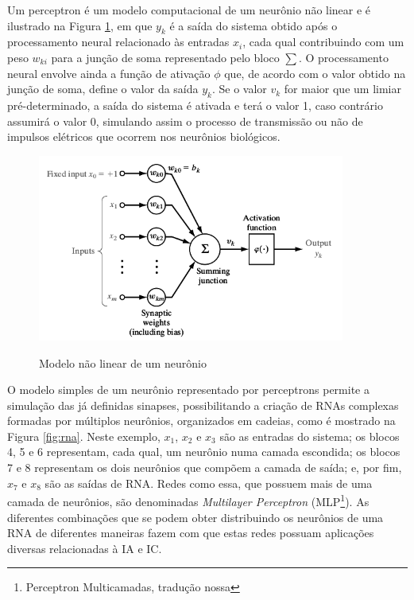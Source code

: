 Um perceptron é um modelo computacional de um neurônio não linear e é ilustrado na Figura \ref{fig:neuronmodel}, em que $y_k$ é a saída do sistema obtido após o processamento neural relacionado às entradas $x_i$, cada qual contribuindo com um peso $w_{ki}$ para a junção de soma representado pelo bloco $\sum$. O processamento neural envolve ainda a função de ativação $\phi$ que, de acordo com o valor obtido na junção de soma, define o valor da saída $y_k$. Se o valor $v_k$ for maior que um limiar pré-determinado, a saída do sistema é ativada e terá o valor 1, caso contrário assumirá o valor 0, simulando assim o processo de transmissão ou não de impulsos elétricos que ocorrem nos neurônios biológicos.

\begin{figure}[!htb]
    \centering
    \caption{Modelo não linear de um neurônio}
    \includegraphics[width=0.9\textwidth]{./04-figuras/neuron-diagram-gray}
    \label{fig:neuronmodel}
\end{figure}

O modelo simples de um neurônio representado por perceptrons permite a simulação das já definidas sinapses, possibilitando a criação de RNAs complexas formadas por múltiplos neurônios, organizados em cadeias, como é mostrado na Figura \ref{fig:rna}. Neste exemplo, $x_1$, $x_2$ e $x_3$ são as entradas do sistema; os blocos 4, 5 e 6 representam, cada qual, um neurônio numa camada escondida; os blocos 7 e 8 representam os dois neurônios que compõem a camada de saída; e, por fim, $x_7$ e $x_8$ são as saídas de RNA. Redes como essa, que possuem mais de uma camada de neurônios, são denominadas \textit{Multilayer Perceptron} (MLP\footnote{Perceptron Multicamadas, tradução nossa}). As diferentes combinações que se podem obter distribuindo os neurônios de uma RNA de diferentes maneiras fazem com que estas redes possuam aplicações diversas relacionadas à IA e IC.



